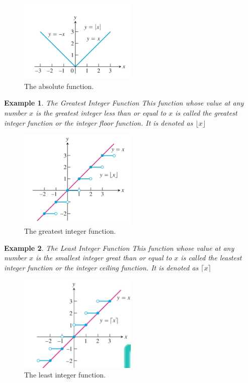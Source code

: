 \documentclass[a4paper,12pt]{article} %
\newtheorem{example}{Example}[section]
\begin{document}
\begin{figure}[h!]
    \centering
    \includegraphics[width=0.5\textwidth]{absolutefun.png}
    \caption{The absolute function.}
    \label{fig:absolutefun}
\end{figure}

\begin{example}{The Greatest Integer Function}
    This function whose value at any number $x$ is the greatest 
    integer less than or equal to $x$ is called the greatest 
    integer function or the integer floor function. It is 
    denoted as $\lfloor x \rfloor$
\end{example}
\begin{figure}[h!]
    \centering
    \includegraphics[width=0.5\textwidth]{gintfun.png}
    \caption{The greatest integer function.}
    \label{fig:gintfun}
\end{figure}

\begin{example}{The Least Integer Function}
    This function whose value at any number $x$ is the smallest 
    integer great than or equal to $x$ is called the leastest 
    integer function or the integer ceiling function. It is 
    denoted as $\lceil x \rceil$
\end{example}
\begin{figure}[h!]
    \centering
    \includegraphics[width=0.5\textwidth]{lintfun.png}
    \caption{The least integer function.}
    \label{fig:lintfun}
\end{figure}
\end{document}
